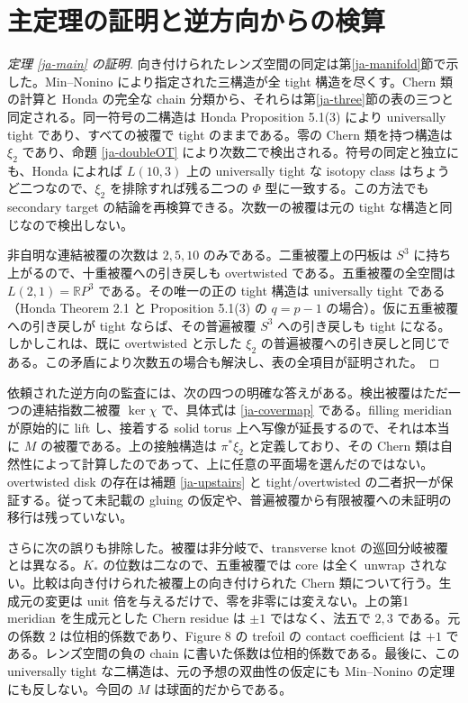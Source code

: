 \documentclass[12pt]{amsart}
\theoremstyle{definition}
\theoremstyle{remark}
\numberwithin{equation}{section}
\newcommand{\R}{\mathbb{R}}
\theoremstyle{definition}
\begin{document}
\section{主定理の証明と逆方向からの検算}\label{ja-proof}
\begin{proof}[定理 \ref{ja-main} の証明]
向き付けられたレンズ空間の同定は第\ref{ja-manifold}節で示した。Min--Nonino により指定された三構造が全 tight 構造を尽くす。Chern 類の計算と Honda の完全な chain 分類から、それらは第\ref{ja-three}節の表の三つと同定される。同一符号の二構造は Honda Proposition 5.1(3) により universally tight であり、すべての被覆で tight のままである。零の Chern 類を持つ構造は $\xi_2$ であり、命題 \ref{ja-doubleOT} により次数二で検出される。符号の同定と独立にも、Honda によれば $L(10,3)$ 上の universally tight な isotopy class はちょうど二つなので、$\xi_2$ を排除すれば残る二つの $\Phi$ 型に一致する。この方法でも secondary target の結論を再検算できる。次数一の被覆は元の tight な構造と同じなので検出しない。

非自明な連結被覆の次数は $2,5,10$ のみである。二重被覆上の円板は $S^3$ に持ち上がるので、十重被覆への引き戻しも overtwisted である。五重被覆の全空間は $L(2,1)=\R P^3$ である。その唯一の正の tight 構造は universally tight である（Honda Theorem 2.1 と Proposition 5.1(3) の $q=p-1$ の場合）。仮に五重被覆への引き戻しが tight ならば、その普遍被覆 $S^3$ への引き戻しも tight になる。しかしこれは、既に overtwisted と示した $\xi_2$ の普遍被覆への引き戻しと同じである。この矛盾により次数五の場合も解決し、表の全項目が証明された。
\end{proof}

依頼された逆方向の監査には、次の四つの明確な答えがある。検出被覆はただ一つの連結指数二被覆 $\ker\chi$ で、具体式は \eqref{ja-covermap} である。filling meridian が原始的に lift し、接着する solid torus 上へ写像が延長するので、それは本当に $M$ の被覆である。上の接触構造は $\pi^*\xi_2$ と定義しており、その Chern 類は自然性によって計算したのであって、上に任意の平面場を選んだのではない。overtwisted disk の存在は補題 \ref{ja-upstairs} と tight/overtwisted の二者択一が保証する。従って未記載の gluing の仮定や、普遍被覆から有限被覆への未証明の移行は残っていない。

さらに次の誤りも排除した。被覆は非分岐で、transverse knot の巡回分岐被覆とは異なる。$K_*$ の位数は二なので、五重被覆では core は全く unwrap されない。比較は向き付けられた被覆上の向き付けられた Chern 類について行う。生成元の変更は unit 倍を与えるだけで、零を非零には変えない。上の第1 meridian を生成元とした Chern residue は $\pm1$ ではなく、法五で $2,3$ である。元の係数 $2$ は位相的係数であり、Figure 8 の trefoil の contact coefficient は $+1$ である。レンズ空間の負の chain に書いた係数は位相的係数である。最後に、この universally tight な二構造は、元の予想の双曲性の仮定にも Min--Nonino の定理にも反しない。今回の $M$ は球面的だからである。
\end{document}
